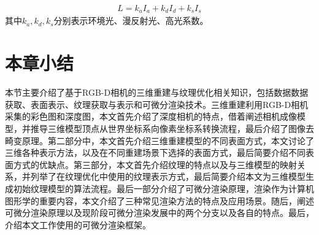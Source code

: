 \begin{align}
    L = k_aI_a + k_dI_d+k_sI_s
\end{align}
其中$k_a,k_d,k_s$分别表示环境光、漫反射光、高光系数。

\section{本章小结}
本节主要介绍了基于RGB-D相机的三维重建与纹理优化相关知识，包括数据数据获取、表面表示、纹理获取与表示和可微分渲染技术。三维重建利用RGB-D相机采集的彩色图和深度图，本文首先介绍了深度相机的特点，借着阐述相机成像模型，并推导三维模型顶点从世界坐标系向像素坐标系转换流程，最后介绍了图像去畸变原理。第二部分中，本文首先介绍三维重建模型的不同表面方式，本文讨论了三维各种表示方法，以及在不同重建场景下选择的表面方式，最后简要介绍不同表面方式的优缺点。第三部分，本文首先介绍纹理的特点以及与三维模型的映射关系，并列举了在纹理优化中使用的纹理表示方式，最后简要介绍本文为三维模型生成初始纹理模型的算法流程。最后一部分介绍了可微分渲染原理，渲染作为计算机图形学的重要内容，本文介绍了三种常见渲染方法的特点及应用场景。随后，阐述可微分渲染原理以及现阶段可微分渲染发展中的两个分支以及各自的特点。最后，介绍本文工作使用的可微分渲染框架。
